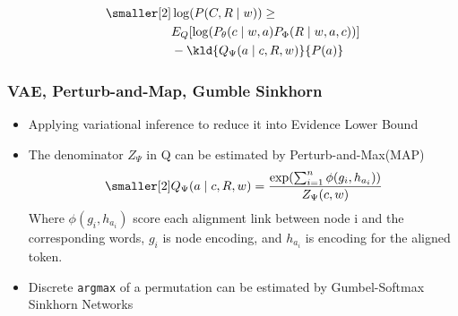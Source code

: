 \begin{equation}
 \label{eq:elbo}
\begin{aligned} \smaller[2]
  & \log(P(C,R \mid w)) \geq \\
  & E_{Q}[\log(P_{\theta}(c\mid w,a) P_{\Phi}(R\mid w,a,c))] \\
  & - \kld{Q_{\Psi}(a\mid c, R,w)}{P(a)}
\end{aligned}
\end{equation}

\subsubsection{VAE, Perturb-and-Map, Gumble Sinkhorn}
\label{sssec:lex-phr:gumble-sinkhorn}
\begin{itemize}
\item Applying variational inference to reduce it into
  Evidence Lower Bound~\cite[ELBO,][]{kingma2013auto}
\item The denominator $Z_{\Psi}$ in Q can be estimated by Perturb-and-Max(MAP)~\cite{papandreouperturb}
\begin{equation}
  \label{eq:posterior_prob}
\begin{aligned} \smaller[2]
Q_{\Psi}(a\mid c, R,w)= \frac{\exp(\sum_{i=1}^{n} \phi(g_{i}, h_{a_{i}}))} {Z_{\Psi}(c,w)}
\end{aligned}
\end{equation}
Where $\phi(g_{i}, h_{a_{i}})$ score each alignment link between node i and the corresponding words,
$g_{i}$ is node encoding, and $h_{a_{i}}$ is encoding for the aligned token.

\item Discrete \texttt{argmax} of a permutation can be estimated by
  Gumbel-Softmax Sinkhorn Networks \cite{mena2018learning, lyu2018amr}
\end{itemize}

